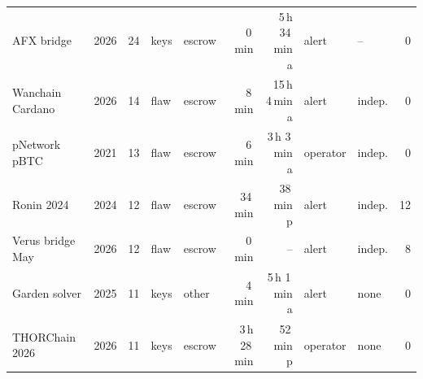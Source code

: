 \begin{table}[t]
\begin{tabular}{@{}l l r l l r r l l r@{}}
AFX bridge & 2026 & 24 & keys & escrow & 0\,min & 5\,h 34\,min a & alert & -- & 0 \\
Wanchain Cardano & 2026 & 14 & flaw & escrow & 8\,min & 15\,h 4\,min a & alert & indep. & 0 \\
pNetwork pBTC & 2021 & 13 & flaw & escrow & 6\,min & 3\,h 3\,min a & operator & indep. & 0 \\
Ronin 2024 & 2024 & 12 & flaw & escrow & 34\,min & 38\,min p & alert & indep. & 12 \\
Verus bridge May & 2026 & 12 & flaw & escrow & 0\,min & -- & alert & indep. & 8 \\
Garden solver & 2025 & 11 & keys & other & 4\,min & 5\,h 1\,min a & alert & none & 0 \\
THORChain 2026 & 2026 & 11 & keys & escrow & 3\,h 28\,min & 52\,min p & operator & none & 0 \\
\bottomrule
\end{tabular}
\end{table}
